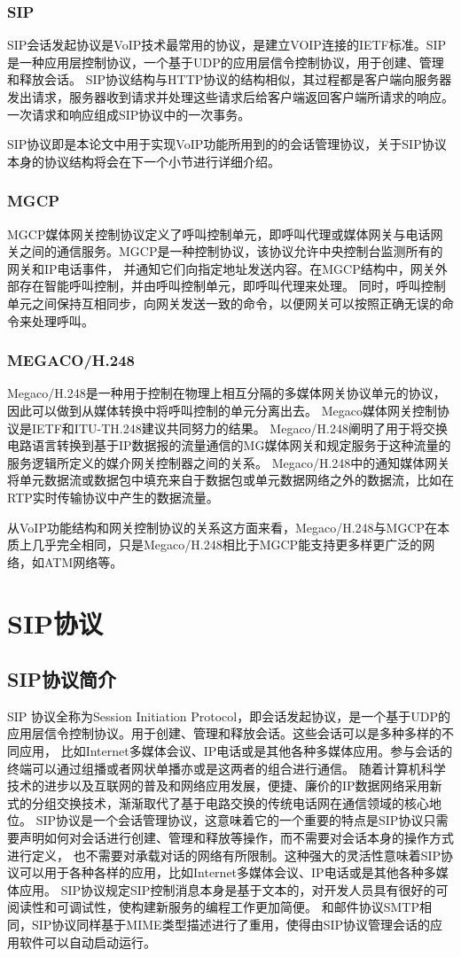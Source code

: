 \documentclass[a4paper,AutoFakeBold,oneside,12pt]{book}
\begin{document}
\subsubsection{SIP}
SIP会话发起协议是VoIP技术最常用的协议，是建立VOIP连接的IETF标准。SIP是一种应用层控制协议，一个基于UDP的应用层信令控制协议，用于创建、管理和释放会话。
SIP协议结构与HTTP协议的结构相似，其过程都是客户端向服务器发出请求，服务器收到请求并处理这些请求后给客户端返回客户端所请求的响应。
一次请求和响应组成SIP协议中的一次事务。

SIP协议即是本论文中用于实现VoIP功能所用到的的会话管理协议，关于SIP协议本身的协议结构将会在下一个小节进行详细介绍。
\subsubsection{MGCP}
MGCP媒体网关控制协议定义了呼叫控制单元，即呼叫代理或媒体网关与电话网关之间的通信服务。MGCP是一种控制协议，该协议允许中央控制台监测所有的网关和IP电话事件，
并通知它们向指定地址发送内容。在MGCP结构中，网关外部存在智能呼叫控制，并由呼叫控制单元，即呼叫代理来处理。
同时，呼叫控制单元之间保持互相同步，向网关发送一致的命令，以便网关可以按照正确无误的命令来处理呼叫。
\subsubsection{MEGACO/H.248}
Megaco/H.248是一种用于控制在物理上相互分隔的多媒体网关协议单元的协议，因此可以做到从媒体转换中将呼叫控制的单元分离出去。
Megaco媒体网关控制协议是IETF和ITU-TH.248建议共同努力的结果。
Megaco/H.248阐明了用于将交换电路语言转换到基于IP数据报的流量通信的MG媒体网关和规定服务于这种流量的服务逻辑所定义的媒介网关控制器之间的关系。
Megaco/H.248中的通知媒体网关将单元数据流或数据包中填充来自于数据包或单元数据网络之外的数据流，比如在RTP实时传输协议中产生的数据流量。

从VoIP功能结构和网关控制协议的关系这方面来看，Megaco/H.248与MGCP在本质上几乎完全相同，只是Megaco/H.248相比于MGCP能支持更多样更广泛的网络，如ATM网络等。
\section{SIP协议}
\subsection{SIP协议简介}
SIP 协议全称为Session Initiation Protocol，即会话发起协议，是一个基于UDP的应用层信令控制协议。用于创建、管理和释放会话。这些会话可以是多种多样的不同应用，
比如Internet多媒体会议、IP电话或是其他各种多媒体应用。参与会话的终端可以通过组播或者网状单播亦或是这两者的组合进行通信。
随着计算机科学技术的进步以及互联网的普及和网络应用发展，便捷、廉价的IP数据网络采用新式的分组交换技术，渐渐取代了基于电路交换的传统电话网在通信领域的核心地位。
SIP协议是一个会话管理协议，这意味着它的一个重要的特点是SIP协议只需要声明如何对会话进行创建、管理和释放等操作，而不需要对会话本身的操作方式进行定义，
也不需要对承载对话的网络有所限制。这种强大的灵活性意味着SIP协议可以用于各种各样的应用，比如Internet多媒体会议、IP电话或是其他各种多媒体应用。
SIP协议规定SIP控制消息本身是基于文本的，对开发人员具有很好的可阅读性和可调试性，使构建新服务的编程工作更加简便。
和邮件协议SMTP相同，SIP协议同样基于MIME类型描述进行了重用，使得由SIP协议管理会话的应用软件可以自动启动运行。
\end{document}
